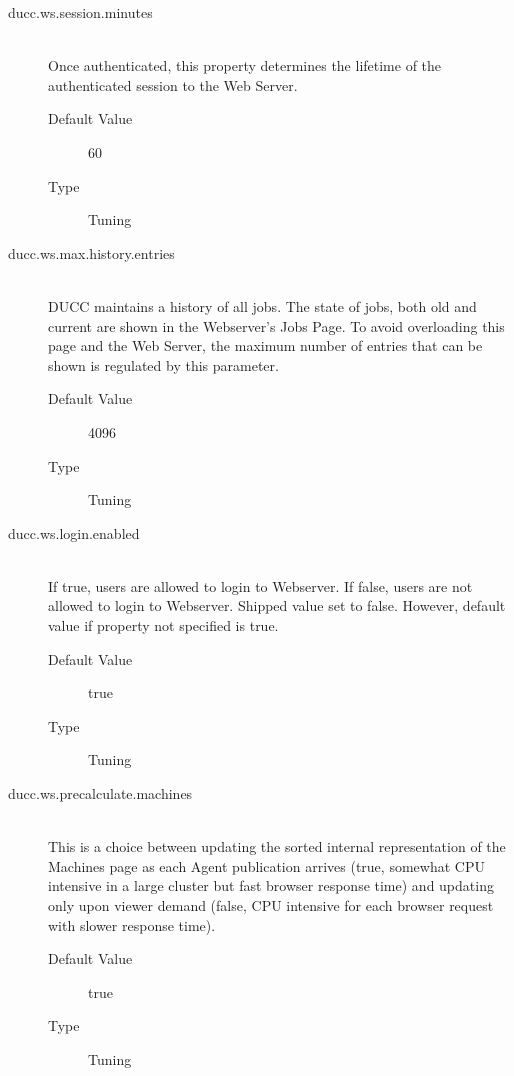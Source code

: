 \begin{description}
        \item[ducc.ws.session.minutes] \hfill \\
          Once authenticated, this property determines the lifetime of the authenticated session to the 
          Web Server. 
          \begin{description}
            \item[Default Value] 60 
            \item[Type] Tuning
          \end{description}

        \item[ducc.ws.max.history.entries] \hfill \\
          DUCC maintains a history of all jobs.  The state of jobs, both old and current are shown
          in the Webserver's Jobs Page.  To avoid overloading this page and the Web Server, the maximum
          number of entries that can be shown is regulated by this parameter.
          \begin{description}
            \item[Default Value] 4096
            \item[Type] Tuning
          \end{description}

        \item[ducc.ws.login.enabled] \hfill \\
          If true, users are allowed to login to Webserver.  If false, users are
          not allowed to login to Webserver.  Shipped value set to false. 
          However, default value if property not specified is true.
          \begin{description}
            \item[Default Value] true
            \item[Type] Tuning
          \end{description}
        
        \item[ducc.ws.precalculate.machines] \hfill \\
          This is a choice between updating the sorted internal representation of the 
          Machines page as each Agent publication arrives (true, somewhat CPU intensive
          in a large cluster but fast browser response time) and updating only upon viewer 
          demand (false, CPU intensive for each browser request with slower response time).
          \begin{description}
            \item[Default Value] true
            \item[Type] Tuning
          \end{description}
            

\end{description}
